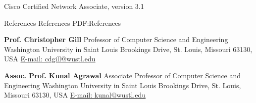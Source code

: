 \documentclass[letterpaper,MMMyyyy,nonstopmode]{simpleresumecv}
\begin{document}
\begin{Body}



\Entry
\BulletItem Cisco Certified Network Associate, version 3.1
\hfill {}






\Section
{References}
{References}
{PDF:References}

\BulletItem
\textbf{Prof. Christopher Gill}
\newline
Professor of Computer Science and Engineering
\newline
Washington University in Saint Louis
 Brookings Drive, St. Louis, Missouri 63130, USA
\newline
\href{mailto:cdgill@wustl.edu}
{E-mail: cdgill@wustl.edu}

\BigGap
\BulletItem
\textbf{Assoc. Prof. Kunal Agrawal}
\newline
Associate Professor of Computer Science and Engineering
\newline
Washington University in Saint Louis
 Brookings Drive, St. Louis, Missouri 63130, USA
\newline
\href{mailto:kunal@wustl.edu}
{E-mail: kunal@wustl.edu}

\begin{comment}

\Section
{Multilingual Unicode Examples}
{Multilingual Unicode Examples}
{PDF:MultilingualUnicodeExamples}

\BulletItem
Assortment of unicode characters from
\href{http://www.ltg.ed.ac.uk/~richard/unicode-sample.html}
{\url{http://www.ltg.ed.ac.uk/~richard/unicode-sample.html}}


\end{comment}
\end{Body}
\end{document}
